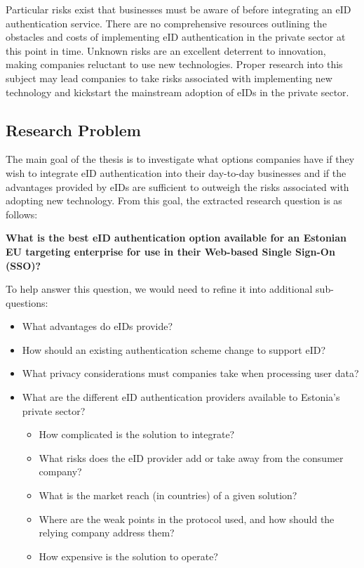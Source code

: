 Particular risks exist that businesses must be aware of before integrating an eID authentication service. There are no comprehensive resources outlining the obstacles and costs of implementing eID authentication in the private sector at this point in time. Unknown risks are an excellent deterrent to innovation, making companies reluctant to use new technologies. Proper research into this subject may lead companies to take risks associated with implementing new technology and kickstart the mainstream adoption of eIDs in the private sector. 

\subsection{Research Problem}

The main goal of the thesis is to investigate what options companies have if they wish to integrate eID authentication into their day-to-day businesses and if the advantages provided by eIDs are sufficient to outweigh the risks associated with adopting new technology. From this goal, the extracted research question is as follows: 

\textbf{What is the best eID authentication option available for an Estonian EU targeting enterprise for use in their Web-based Single Sign-On (SSO)?}

To help answer this question, we would need to refine it into additional sub-questions:

\begin{itemize}
    \item What advantages do eIDs provide?
    \item How should an existing authentication scheme change to support eID?
    \item What privacy considerations must companies take when processing user data?
    \item What are the different eID authentication providers available to Estonia's private sector?
    \begin{itemize}
        \item How complicated is the solution to integrate?
        \item What risks does the eID provider add or take away from the consumer company?
        \item What is the market reach (in countries) of a given solution?
        \item Where are the weak points in the protocol used, and how should the relying company address them?
        \item How expensive is the solution to operate?
    \end{itemize}
\end{itemize}


